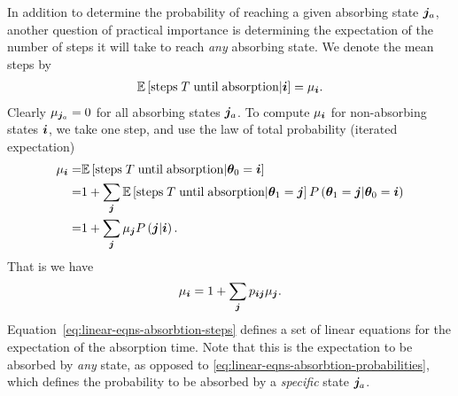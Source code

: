In addition to determine the probability of reaching a given absorbing state ${\bm j}_a$, another question of practical importance is determining the expectation of the number of steps it will take to reach \emph{any} absorbing state.
We denote the mean steps by
\begin{align}
    \mathbb{E}\left[\mathrm{steps}\;T\;\mathrm{until\;absorption}|{\bm i}\right]
    =
    \mu_{{\bm i}}
    .
\end{align}
Clearly $\mu_{{\bm j}_a}=0$ for all absorbing states ${\bm j}_a$.
To compute $\mu_{{\bm i}}$ for non-absorbing states ${\bm i}$, we take one step, and use the law of total probability (iterated expectation)
\begin{align}
    \label{eq:linear-eqns-absorbtion-steps-derivation}
    \mu_{{\bm i}}
    =&
    \mathbb{E}\left[\mathrm{steps}\;T\;\mathrm{until\;absorption}|{\bm \theta}_0={\bm i}\right]
    \nonumber\\
    =&
    1
    +
    \sum_{{\bm j}} \mathbb{E}\left[\mathrm{steps}\;T\;\mathrm{until\;absorption}|{\bm \theta}_1={\bm j}\right]
                P\left({\bm \theta}_1={\bm j}|{\bm \theta}_0={\bm i}\right)
    \nonumber\\
    =&
    1
    +
    \sum_{{\bm j}} \mu_{{\bm j}}P\left({\bm j}|{\bm i}\right)
    .
\end{align}
That is we have
\begin{align}
    \label{eq:linear-eqns-absorbtion-steps}
    \mu_{{\bm i}}
    =
    1
    +
    \sum_{{\bm j}} p_{{\bm i}{\bm j}}\mu_{{\bm j}}
    .
\end{align}
Equation~\eqref{eq:linear-eqns-absorbtion-steps} defines a set of linear equations for the expectation of the absorption time.
Note that this is the expectation to be absorbed by \emph{any} state, as opposed to \eqref{eq:linear-eqns-absorbtion-probabilities}, which defines the probability to be absorbed by a \emph{specific} state ${\bm j}_a$. 

